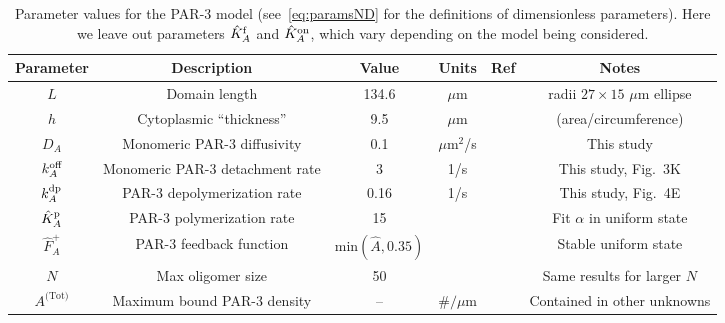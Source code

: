 \documentclass[11pt]{article}
\newcommand{\6}[1]{#1_{\text{6}}}
\newcommand{\3}[1]{#1_{\text{3}}}
\newcommand{\Tot}[1]{#1^\text{(Tot)}}
\newcommand{\A}[1]{#1_A}
\begin{document}
\begin{table}
\begin{small}
\centering
\begin{tabular}{|c|c|c|c|c|c|}\hline
Parameter & Description & Value & Units & Ref & Notes \\ \hline
$L$ & Domain length & 134.6 & $\mu$m &  \cite{goehring2011polarization} & radii $27 \times 15$ $\mu$m ellipse\\
$h$ & Cytoplasmic ``thickness'' & 9.5 & $\mu$m &  \cite{goehring2011polarization}  &  (area/circumference)\\ \hline
$\A{D} $ & Monomeric PAR-3 diffusivity & 0.1 & $\mu$m$^2$/s &  & This study \\
$k^\text{off}_{A}$ & Monomeric PAR-3 detachment rate &  3& 1/s & & This study, Fig.\ 3K\\
$\A{\kdp}$ & PAR-3 depolymerization rate & 0.16 & 1/s & & This study, Fig.\ 4E \\
$\hat{K}^\text{p}_A$ & PAR-3 polymerization rate & 15 & & & Fit $\alpha$ in uniform state  \\
$\hat F_A^+$ & PAR-3 feedback function &$\text{min}\left(\hat A,0.35\right)$ &  &\cite{lang2022oligomerization} &  Stable uniform state\\
$N$ & Max oligomer size & 50 & & & Same results for larger $N$\\
$\Tot{A}$ & Maximum bound PAR-3 density & -- & $\#/\mu$m & & Contained in other unknowns \\ \hline
\end{tabular}
\caption{\label{tab:paramsP3}Parameter values for the PAR-3 model (see\ \eqref{eq:paramsND} for the definitions of dimensionless parameters). Here we leave out parameters $\hat{K}^\text{f}_A$ and $\hat{K}^\text{on}_A$, which vary depending on the model being considered.}
\end{small}
\end{table}
\end{document}

